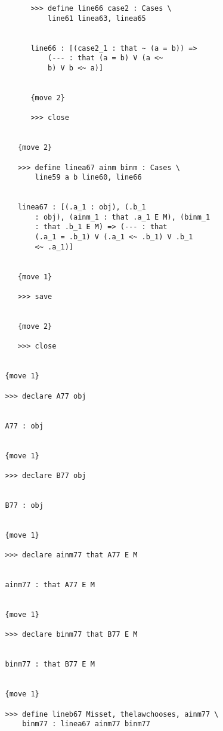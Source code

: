 \documentclass[12pt]{article}
\begin{document}
\begin{verbatim}
         >>> define line66 case2 : Cases \
             line61 linea63, linea65


         line66 : [(case2_1 : that ~ (a = b)) => 
             (--- : that (a = b) V (a <~ 
             b) V b <~ a)]


         {move 2}

         >>> close


      {move 2}

      >>> define linea67 ainm binm : Cases \
          line59 a b line60, line66


      linea67 : [(.a_1 : obj), (.b_1 
          : obj), (ainm_1 : that .a_1 E M), (binm_1 
          : that .b_1 E M) => (--- : that 
          (.a_1 = .b_1) V (.a_1 <~ .b_1) V .b_1 
          <~ .a_1)]


      {move 1}

      >>> save


      {move 2}

      >>> close


   {move 1}

   >>> declare A77 obj


   A77 : obj


   {move 1}

   >>> declare B77 obj


   B77 : obj


   {move 1}

   >>> declare ainm77 that A77 E M


   ainm77 : that A77 E M


   {move 1}

   >>> declare binm77 that B77 E M


   binm77 : that B77 E M


   {move 1}

   >>> define lineb67 Misset, thelawchooses, ainm77 \
       binm77 : linea67 ainm77 binm77



\end{verbatim}
\end{document}
